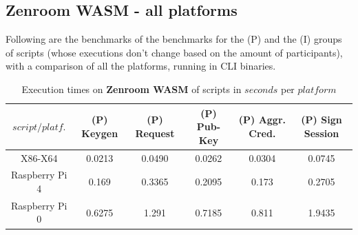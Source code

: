 \documentclass[twocolumn]{article}
\begin{document}
\newpage


\subsection*{Zenroom WASM - all platforms}

Following are the benchmarks of the benchmarks for the (P) and the (I) groups of scripts (whose executions don't change based on the amount of participants), with a comparison of all the platforms, running in CLI binaries.


\begin{table}[h!]
  \begin{center}
    \caption{Execution times on \textbf{Zenroom WASM} of scripts in $seconds$ per $platform$}
      \label{tab:table1}
        \begin{tabular} {c|c|c|c|c|c}
          \toprule
\textbf{$script / platf.$} & \textbf{(P) Keygen} & \textbf{(P) Request} & \textbf{(P) Pub-Key} & \textbf{(P) Aggr. Cred.} & \textbf{(P) Sign Session} \\
          \midrule
X86-X64			&	0.0213	&	0.0490	&	0.0262	&	0.0304	&	0.0745		\\
Raspberry Pi  4	&	0.169	&	0.3365	&	0.2095	&	0.173	&	0.2705		\\
Raspberry Pi  0	&	0.6275	&	1.291	&	0.7185	&	0.811	&	1.9435		\\
      \bottomrule %
    \end{tabular}
  \end{center}
\end{table}
\end{document}
